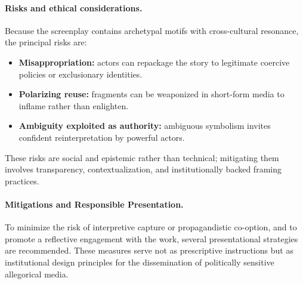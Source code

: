 \documentclass[12pt]{article}
\begin{document}
\paragraph{Risks and ethical considerations.}
Because the screenplay contains archetypal motifs with cross-cultural resonance, the principal risks are:
\begin{itemize}
  \item \textbf{Misappropriation:} actors can repackage the story to legitimate coercive policies or exclusionary identities.
  \item \textbf{Polarizing reuse:} fragments can be weaponized in short-form media to inflame rather than enlighten.
  \item \textbf{Ambiguity exploited as authority:} ambiguous symbolism invites confident reinterpretation by powerful actors.
\end{itemize}
These risks are social and epistemic rather than technical; mitigating them involves transparency, contextualization, and institutionally backed framing practices.

\paragraph{Mitigations and Responsible Presentation.}
To minimize the risk of interpretive capture or propagandistic co-option, and to promote a reflective engagement with the work, several presentational strategies are recommended. These measures serve not as prescriptive instructions but as institutional design principles for the dissemination of politically sensitive allegorical media.
\end{document}
